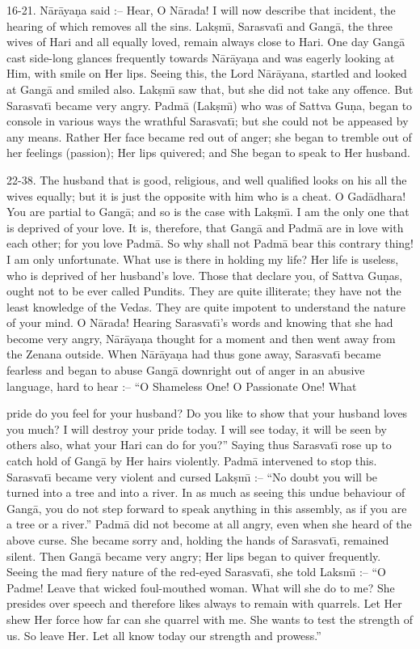 16-21. N\=ar\=aya\d{n}a said :-- Hear, O N\=arada! I will now describe that incident, the hearing of which removes all the sins. Lak\d{s}m\={\i}, Sarasvat\={\i} and Gang\=a, the three wives of Hari and all equally loved, remain always close to Hari. One day Gang\=a cast side-long glances frequently towards N\=ar\=aya\d{n}a and was eagerly looking at Him, with smile on Her lips. Seeing this, the Lord N\=ar\=ayana, startled and looked at Gang\=a and smiled also. Lak\d{s}m\={\i} saw that, but she did not take any offence. But Sarasvat\={\i} became very angry. Padm\=a (Lak\d{s}m\={\i}) who was of Sattva Gu\d{n}a, began to console in various ways the wrathful Sarasvat\={\i}; but she could not be appeased by any means. Rather Her face became red out of anger; she began to tremble out of her feelings (passion); Her lips quivered; and She began to speak to Her husband.

22-38. The husband that is good, religious, and well qualified looks on his all the wives equally; but it is just the opposite with him who is a cheat. O Gad\=adhara! You are partial to Gang\=a; and so is the case with Lak\d{s}m\={\i}. I am the only one that is deprived of your love. It is, therefore, that Gang\=a and Padm\=a are in love with each other; for you love Padm\=a. So why shall not Padm\=a bear this contrary thing! I am only unfortunate. What use is there in holding my life? Her life is useless, who is deprived of her husband's love. Those that declare you, of Sattva Gu\d{n}as, ought not to be ever called Pundits. They are quite illiterate; they have not the least knowledge of the Vedas. They are quite impotent to understand the nature of your mind. O N\=arada! Hearing Sarasvat\={\i}'s words and knowing that she had become very angry, N\=ar\=aya\d{n}a thought for a moment and then went away from the Zenana outside. When N\=ar\=aya\d{n}a had thus gone away, Sarasvat\={\i} became fearless and began to abuse Gang\=a downright out of anger in an abusive language, hard to hear :-- ``O Shameless One! O Passionate One! What

pride do you feel for your husband? Do you like to show that your husband loves you much? I will destroy your pride today. I will see today, it will be seen by others also, what your Hari can do for you?'' Saying thus Sarasvat\={\i} rose up to catch hold of Gang\=a by Her hairs violently. Padm\=a intervened to stop this. Sarasvat\={\i} became very violent and cursed Lak\d{s}m\={\i} :-- ``No doubt you will be turned into a tree and into a river. In as much as seeing this undue behaviour of Gang\=a, you do not step forward to speak anything in this assembly, as if you are a tree or a river.'' Padm\=a did not become at all angry, even when she heard of the above curse. She became sorry and, holding the hands of Sarasvat\={\i}, remained silent. Then Gang\=a became very angry; Her lips began to quiver frequently. Seeing the mad fiery nature of the red-eyed Sarasvat\={\i}, she told Laksm\={\i} :-- ``O Padme! Leave that wicked foul-mouthed woman. What will she do to me? She presides over speech and therefore likes always to remain with quarrels. Let Her shew Her force how far can she quarrel with me. She wants to test the strength of us. So leave Her. Let all know today our strength and prowess.''


